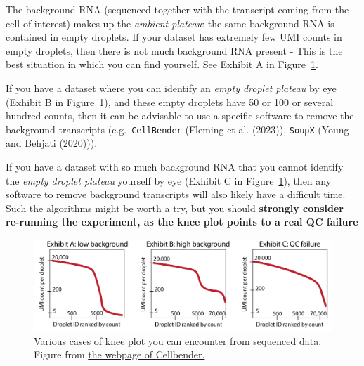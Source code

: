 \documentclass[
  letterpaper,
  DIV=11,
  numbers=noendperiod]{scrartcl}
\begin{document}
\begin{tcolorbox}[enhanced jigsaw, arc=.35mm, toprule=.15mm, breakable, bottomrule=.15mm, title=\textcolor{quarto-callout-tip-color}{\faLightbulb}\hspace{0.5em}{Something more about knee plots}, opacityback=0, colframe=quarto-callout-tip-color-frame, opacitybacktitle=0.6, leftrule=.75mm, titlerule=0mm, left=2mm, bottomtitle=1mm, toptitle=1mm, colback=white, rightrule=.15mm, colbacktitle=quarto-callout-tip-color!10!white, coltitle=black]

The background RNA (sequenced together with the transcript coming from
the cell of interest) makes up the \emph{ambient plateau}: the same
background RNA is contained in empty droplets. If your dataset has
extremely few UMI counts in empty droplets, then there is not much
background RNA present - This is the best situation in which you can
find yourself. See Exhibit A in Figure~\ref{fig-bender}.

If you have a dataset where you can identify an \emph{empty droplet
plateau} by eye (Exhibit B in Figure~\ref{fig-bender}), and these empty
droplets have 50 or 100 or several hundred counts, then it can be
advisable to use a specific software to remove the background
transcripts (e.g.~\texttt{CellBender} (Fleming et al. (2023)),
\texttt{SoupX} (Young and Behjati (2020))).

If you have a dataset with so much background RNA that you cannot
identify the \emph{empty droplet plateau} yourself by eye (Exhibit C in
Figure~\ref{fig-bender}), then any software to remove background
transcripts will also likely have a difficult time. Such the algorithms
might be worth a try, but you should \textbf{strongly consider
re-running the experiment, as the knee plot points to a real QC failure}

\begin{figure}[H]

{\centering \includegraphics[width=6.25in,height=\textheight]{images/UMI_curve_tropes.png}

}

\caption{\label{fig-bender}Various cases of knee plot you can encounter
from sequenced data. Figure from
\href{https://cellbender.readthedocs.io/}{the webpage of Cellbender.}}

\end{figure}

\end{tcolorbox}
\end{document}
